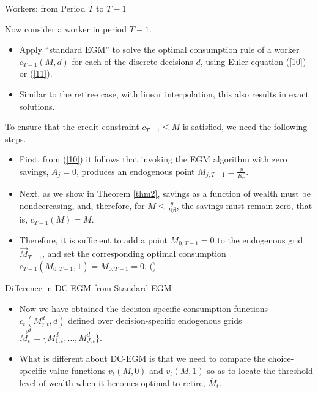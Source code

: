 \documentclass[aspectratio=169]{beamer}
\newcommand{\highlight}[1]{{\color{red}{#1}}}
\begin{document}
\begin{frame}{Workers: from Period $T$ to $T-1$}

	Now consider a worker in period $T-1$. 

	\begin{itemize}\small
		
		\item Apply ``standard EGM'' to solve the optimal consumption rule of a worker $c_{T-1}(M,d)$ for each of the discrete decisions $d$, using Euler equation (\ref{10}) or (\ref{11}). 
		\item Similar to the retiree case, with linear interpolation, this also results in exact solutions.

	\end{itemize}

	To ensure that the credit constraint $c_{T-1} \leq M$ is satisfied, we need the following steps. 
	\begin{itemize}\small
		\item First, from (\ref{10}) it follows that invoking the EGM algorithm with zero savings, $A_j=0$, produces an endogenous point $M_{j, T-1} = \frac{y}{R\beta}$. 
		\item Next, as we show in Theorem \ref{thm2}, savings as a function of wealth must be nondecreasing, and, therefore, for $M\leq \frac{y}{R\beta}$, the savings must remain zero, that is, $c_{T-1}(M) = M$.
		\item Therefore, it is sufficient to add a point $M_{0, T-1} = 0$ to the endogenous grid $\overrightarrow{M}_{T-1}$, and set the corresponding optimal consumption $c_{T-1}(M_{0, T-1}, 1) = M_{0, T-1}=0$. (\highlight{Linear Interpolation Matters!})
	\end{itemize}
\end{frame}

\begin{frame}{Difference in DC-EGM from Standard EGM}\small
	\begin{itemize}
		\item Now we have obtained the decision-specific consumption functions $c_t(M_{j,t}^d, d)$ defined over decision-specific endogenous grids $\overrightarrow{M}_t^d = \{M_{1,t}^d, \ldots, M_{J,t}^d\}$.
		\item What is different about DC-EGM is that we need to compare the choice-specific value functions $v_t(M,0)$ and $v_t(M, 1)$ so as to locate the threshold level of wealth when it becomes optimal to retire, $\overline{M}_t$.

	\end{itemize}
\end{frame}
\end{document}
